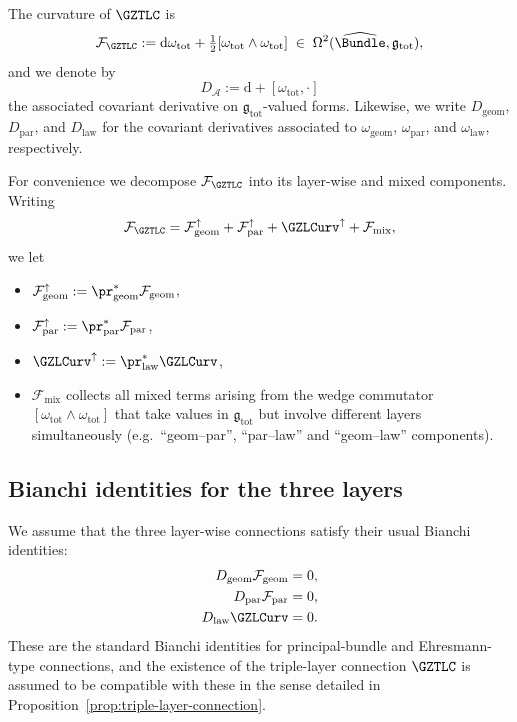 \documentclass[11pt]{book}
\theoremstyle{plain}
\theoremstyle{definition}
\begin{document}
The curvature of \(\GZTLC\) is
\[
  \mathcal{F}_{\GZTLC}
  :=
  \mathrm{d}\omega_{\mathrm{tot}}
  +
  \tfrac12[\omega_{\mathrm{tot}}\wedge\omega_{\mathrm{tot}}]
  \;\in\;
  \Omega^2(\widehat{\Bundle},\mathfrak{g}_{\mathrm{tot}}),
\]
and we denote by
\[
  D_{\mathcal{A}}
  :=
  \mathrm{d}
  +
  [\omega_{\mathrm{tot}},\cdot]
\]
the associated covariant derivative on
\(\mathfrak{g}_{\mathrm{tot}}\)-valued forms.  Likewise, we write
\(D_{\mathrm{geom}}\), \(D_{\mathrm{par}}\), and \(D_{\mathrm{law}}\)
for the covariant derivatives associated to
\(\omega_{\mathrm{geom}}\), \(\omega_{\mathrm{par}}\), and
\(\omega_{\mathrm{law}}\), respectively.



For convenience we decompose \(\mathcal{F}_{\GZTLC}\) into its
layer-wise and mixed components.  Writing
\[
  \mathcal{F}_{\GZTLC}
  =
  \mathcal{F}_{\mathrm{geom}}^{\uparrow}
  +
  \mathcal{F}_{\mathrm{par}}^{\uparrow}
  +
  \GZLCurv^{\uparrow}
  +
  \mathcal{F}_{\mathrm{mix}},
\]
we let
\begin{itemize}
  \item \(\mathcal{F}_{\mathrm{geom}}^{\uparrow}
          := \pr_{\mathrm{geom}}^*\mathcal{F}_{\mathrm{geom}}\),
  \item \(\mathcal{F}_{\mathrm{par}}^{\uparrow}
          := \pr_{\mathrm{par}}^*\mathcal{F}_{\mathrm{par}}\),
  \item \(\GZLCurv^{\uparrow}
          := \pr_{\mathrm{law}}^*\GZLCurv\),
  \item \(\mathcal{F}_{\mathrm{mix}}\) collects all mixed terms arising
        from the wedge commutator
        \([\omega_{\mathrm{tot}}\wedge\omega_{\mathrm{tot}}]\) that take
        values in \(\mathfrak{g}_{\mathrm{tot}}\) but involve different
        layers simultaneously (e.g.\ ``geom–par'', ``par–law'' and
        ``geom–law'' components).
\end{itemize}



\subsection*{Bianchi identities for the three layers}


We assume that the three layer-wise connections satisfy their usual
Bianchi identities:
\begin{align}
  D_{\mathrm{geom}} \mathcal{F}_{\mathrm{geom}} &= 0,
  \label{eq:geom-Bianchi} \\
  D_{\mathrm{par}}  \mathcal{F}_{\mathrm{par}}  &= 0,
  \label{eq:par-Bianchi} \\
  D_{\mathrm{law}}  \GZLCurv                 &= 0.
  \label{eq:law-Bianchi}
\end{align}
These are the standard Bianchi identities for principal-bundle and
Ehresmann-type connections, and the existence of the triple-layer
connection \(\GZTLC\) is assumed to be compatible with these in the
sense detailed in Proposition~\ref{prop:triple-layer-connection}.
\end{document}
